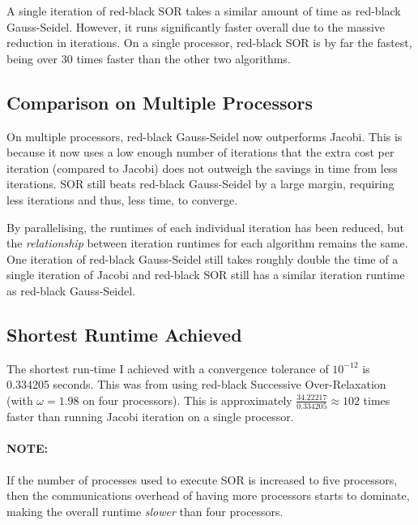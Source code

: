 \documentclass{article}
\begin{document}
A single iteration of red-black SOR takes a similar amount of time as red-black Gauss-Seidel. However, it runs significantly faster overall due to the massive reduction in iterations. On a single processor, red-black SOR is by far the fastest, being over $30$ times faster than the other two algorithms.

\subsection{Comparison on Multiple Processors}

On multiple processors, red-black Gauss-Seidel now outperforms Jacobi. This is because it now uses a low enough number of iterations that the extra cost per iteration (compared to Jacobi) does not outweigh the savings in time from less iterations. SOR still beats red-black Gauss-Seidel by a large margin, requiring less iterations and thus, less time, to converge.

By parallelising, the runtimes of each individual iteration has been reduced, but the \textit{relationship} between iteration runtimes for each algorithm remains the same. One iteration of red-black Gauss-Seidel still takes roughly double the time of a single iteration of Jacobi and red-black SOR still has a similar iteration runtime as red-black Gauss-Seidel.

\subsection{Shortest Runtime Achieved}

The shortest run-time I achieved with a convergence tolerance of $10^{-12}$ is 0.334205 seconds. This was from using red-black Successive Over-Relaxation (with $\omega = 1.98$ on four processors). This is approximately $\frac{34.22217}{0.334205} \approx 102$ times faster than running Jacobi iteration on a single processor.

\paragraph{\textbf{NOTE}: } If the number of processes used to execute SOR is increased to five processors, then the communications overhead of having more processors starts to dominate, making the overall runtime \textit{slower} than four processors. 
\end{document}
